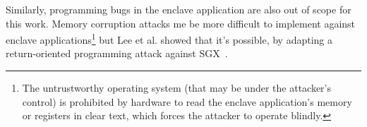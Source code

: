 Similarly, programming bugs in the enclave application are also out of scope
for this work.  Memory corruption attacks me be more difficult to implement
against enclave applications\footnote{The untrustworthy operating system (that
may be under the attacker's control) is prohibited by hardware to read the
enclave application's memory or registers in clear text, which forces the
attacker to operate blindly.} but Lee et al. showed that it's possible, by
adapting a return-oriented programming attack against SGX~\cite{Lee2017a}.
